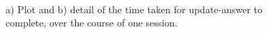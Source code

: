 \documentclass[12pt,twoside,notitlepage,xetex]{report}
\begin{document}
{\begin{center}
\begin{figure}[H]
\begin{center}
\\
\end{center}
\caption{a) Plot and b) detail of the time taken for {\ttfamily update-answer} to complete, over the course of one session.}
\label{fig:UpdateTimes}
\end{figure}
\end{center}

}
\end{document}
